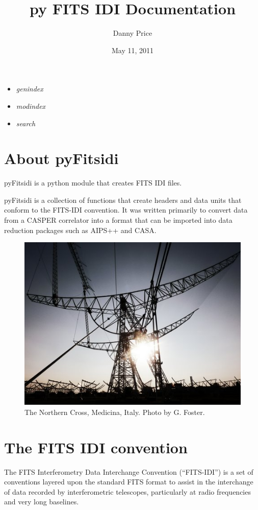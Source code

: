 \documentclass[letterpaper,10pt,english]{sphinxmanual}
\title{py FITS IDI Documentation}
\date{May 11, 2011}
\author{Danny Price}
\begin{document}
\maketitle
\tableofcontents
{}\label{index::doc}

\begin{itemize}
\item {} 
\emph{genindex}

\item {} 
\emph{modindex}

\item {} 
\emph{search}

\end{itemize}


\chapter{About pyFitsidi}
\label{index:about-pyfitsidi}\label{index:welcome-to-pyfitsidi}
pyFitsidi is a python module that creates FITS IDI files.

pyFitsidi is a collection of functions that create headers and data units that conform to the FITS-IDI convention. It was written primarily to convert data from a CASPER correlator into a format that can be imported into data reduction packages such as AIPS++ and CASA.
\begin{figure}[htbp]
\centering
\capstart

\includegraphics{medicina.jpg}
\caption{The Northern Cross, Medicina, Italy. Photo by G. Foster.}\end{figure}


\chapter{The FITS IDI convention}
\label{index:the-fits-idi-convention}
The FITS Interferometry Data Interchange Convention (“FITS-IDI”) is a set of conventions layered upon the standard FITS format to assist in the interchange of data recorded by interferometric telescopes, particularly at radio frequencies and very long baselines.
\end{document}
